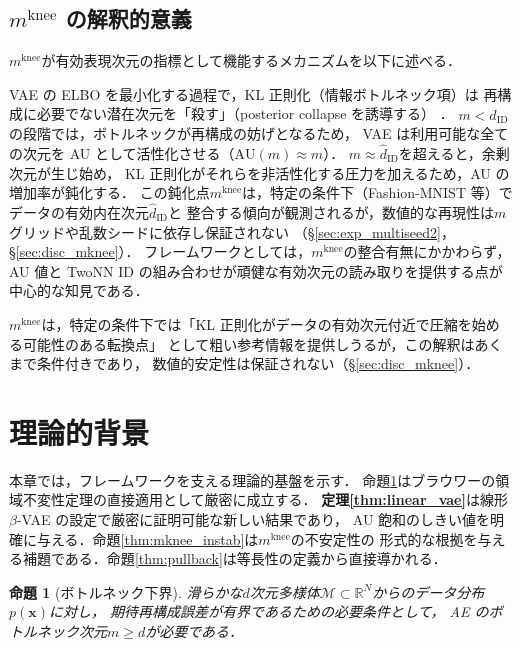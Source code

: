 \documentclass[11pt,a4paper]{jsarticle}
\newtheorem{proposition}{命題}
\newcommand{\R}{\mathbb{R}}
\newcommand{\mknee}{m^{\mathrm{knee}}}
\begin{document}
\subsection{$\mknee$ の解釈的意義}\label{sec:framework_mknee_interp}

$\mknee$が有効表現次元の指標として機能するメカニズムを以下に述べる．

VAE の ELBO を最小化する過程で，KL 正則化（情報ボトルネック項）は
再構成に必要でない潜在次元を「殺す」（posterior collapse を誘導する）
\cite{lucas2019elbo,higgins2017betavae}．
$m < \hat{d}_\mathrm{ID}$の段階では，ボトルネックが再構成の妨げとなるため，
VAE は利用可能な全ての次元を AU として活性化させる（$\mathrm{AU}(m) \approx m$）．
$m \approx \hat{d}_\mathrm{ID}$を超えると，余剰次元が生じ始め，
KL 正則化がそれらを非活性化する圧力を加えるため，AU の増加率が鈍化する．
この鈍化点$\mknee$は，特定の条件下（Fashion-MNIST 等）でデータの有効内在次元$\hat{d}_\mathrm{ID}$と
整合する傾向が観測されるが，数値的な再現性は$m$グリッドや乱数シードに依存し保証されない
（§\ref{sec:exp_multiseed2}，§\ref{sec:disc_mknee}）．
フレームワークとしては，$\mknee$の整合有無にかかわらず，
AU 値と TwoNN ID の組み合わせが頑健な有効次元の読み取りを提供する点が中心的な知見である．

$\mknee$は，特定の条件下では「KL 正則化がデータの有効次元付近で圧縮を始める可能性のある転換点」
として粗い参考情報を提供しうるが，この解釈はあくまで条件付きであり，
数値的安定性は保証されない（§\ref{sec:disc_mknee}）．

\section{理論的背景}\label{sec:theory}

本章では，フレームワークを支える理論的基盤を示す．
命題\ref{thm:lower_bound}はブラウワーの領域不変性定理の直接適用として厳密に成立する．
\textbf{定理\ref{thm:linear_vae}}は線形$\beta$-VAE の設定で厳密に証明可能な新しい結果であり，
AU 飽和のしきい値を明確に与える．命題\ref{thm:mknee_instab}は$\mknee$の不安定性の
形式的な根拠を与える補題である．命題\ref{thm:pullback}は等長性の定義から直接導かれる．

\begin{proposition}[ボトルネック下界]\label{thm:lower_bound}
滑らかな$d$次元多様体$\mathcal{M} \subset \R^N$からのデータ分布$p(\boldsymbol{x})$に対し，
期待再構成誤差が有界であるための必要条件として，
AE のボトルネック次元$m \geq d$が必要である．
\end{proposition}
\end{document}
